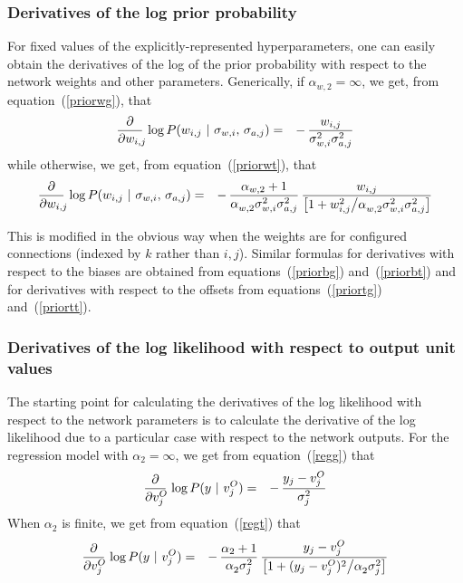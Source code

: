 \documentclass{report}[11pt]
\def\beq{\begin{eqnarray}}
\def\eeq{\end{eqnarray}}
\def\eep{\end{eqnarray}}
\begin{document}
\subsubsection*{Derivatives of the log prior probability}

For fixed values of the explicitly-represented hyperparameters, one can
easily obtain the derivatives of the log of the prior probability with 
respect to the network weights and other parameters.  Generically, if
$\alpha_{w,2}=\infty$, we get, from equation~(\ref{priorwg}), that\beq
  {\partial \over \partial w_{i,j}\!\!}\,
     \log P(w_{i,j}\ |\ \sigma_{w,i},\,\sigma_{a,j}) & = &
     -\,{w_{i,j} \over \sigma_{w,i}^2\sigma_{a,j}^2}
\eeq%
while otherwise, we get, from equation~(\ref{priorwt}), that\beq
  {\partial \over \partial w_{i,j}\!\!}\,
     \log P(w_{i,j}\ |\ \sigma_{w,i},\,\sigma_{a,j}) & = &
     -\, {\alpha_{w,2}+1 \over \alpha_{w,2}^{\ }\sigma_{w,i}^2\sigma_{a,j}^2}\,
    { w_{i,j} \over \big[
      1 + w_{i,j}^2 \big/ \alpha_{w,2}^{\ }\sigma_{w,i}^2\sigma_{a,j}^2
      \big]}
\eep

This is modified in the obvious way when the weights are for
configured connections (indexed by $k$ rather than $i,j$).
Similar formulas for derivatives with respect to the biases are
obtained from equations~(\ref{priorbg}) and~(\ref{priorbt}) and for
derivatives with respect to the offsets from equations~(\ref{priortg})
and~(\ref{priortt}).


\subsubsection*{Derivatives of the log likelihood with respect to 
                output unit values}

The starting point for calculating the derivatives of the log
likelihood with respect to the network parameters is to calculate the
derivative of the log likelihood due to a particular case with respect
to the network outputs.  For the regression model with
$\alpha_2=\infty$, we get from equation~(\ref{regg}) that\beq
  {\partial \over \partial v^O_j\!}\, \log P(y\ |\ v^O_j) & = &
    -\, { y_j-v^O_j \over \sigma_j^2 }
\label{regd}\eeq%
When $\alpha_2$ is finite, we get from equation~(\ref{regt})
that\beq
  {\partial \over \partial v^O_j\!}\, \log P(y\ |\ v^O_j) & = &
    -\, { \alpha_2+1 \over \alpha_2^{\ } \sigma_j^2}\,
        { y_j - v^O_j \over \big[1 + (y_j - v^O_j)^2 \big/
                                 \alpha_2^{\ } \sigma_j^2\big] }
\label{regd2}\eep
\end{document}
